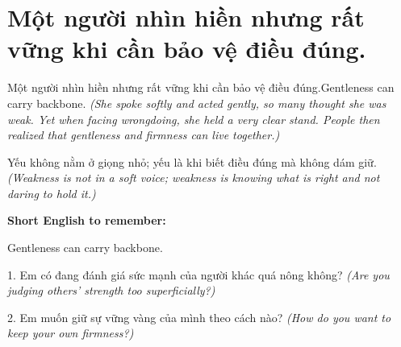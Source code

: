 \section{Một người nhìn hiền nhưng rất vững khi cần bảo vệ điều đúng.}
\begin{truyen}{Một người nhìn hiền nhưng rất vững khi cần bảo vệ điều đúng.}{Gentleness can carry backbone.}
\textit{(She spoke softly and acted gently, so many thought she was weak. Yet when facing wrongdoing, she held a very clear stand. People then realized that gentleness and firmness can live together.)}
\end{truyen}
\begin{baihoc}
Yếu không nằm ở giọng nhỏ; yếu là khi biết điều đúng mà không dám giữ.
\textit{(Weakness is not in a soft voice; weakness is knowing what is right and not daring to hold it.)}
\end{baihoc}
\begin{ghinhoanh}
\textbf{Short English to remember:}

Gentleness can carry backbone.
\end{ghinhoanh}
\begin{tuhocnhanh}
1. Em có đang đánh giá sức mạnh của người khác quá nông không? \textit{(Are you judging others' strength too superficially?)}

2. Em muốn giữ sự vững vàng của mình theo cách nào? \textit{(How do you want to keep your own firmness?)}
\end{tuhocnhanh}
\ngancach

